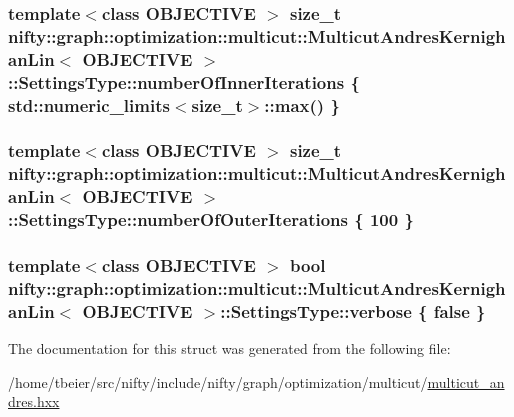 \subsubsection[{number\+Of\+Inner\+Iterations}]{\setlength{\rightskip}{0pt plus 5cm}template$<$class O\+B\+J\+E\+C\+T\+I\+V\+E $>$ size\+\_\+t {\bf nifty\+::graph\+::optimization\+::multicut\+::\+Multicut\+Andres\+Kernighan\+Lin}$<$ O\+B\+J\+E\+C\+T\+I\+V\+E $>$\+::Settings\+Type\+::number\+Of\+Inner\+Iterations \{ std\+::numeric\+\_\+limits$<$size\+\_\+t$>$\+::max() \}}\label{structnifty_1_1graph_1_1optimization_1_1multicut_1_1MulticutAndresKernighanLin_1_1SettingsType_a7f8372e73c3efb9307299428cc546128}
\hypertarget{structnifty_1_1graph_1_1optimization_1_1multicut_1_1MulticutAndresKernighanLin_1_1SettingsType_a04fd536ef01d3902d2f1c362ed34e6b2}{}
\subsubsection[{number\+Of\+Outer\+Iterations}]{\setlength{\rightskip}{0pt plus 5cm}template$<$class O\+B\+J\+E\+C\+T\+I\+V\+E $>$ size\+\_\+t {\bf nifty\+::graph\+::optimization\+::multicut\+::\+Multicut\+Andres\+Kernighan\+Lin}$<$ O\+B\+J\+E\+C\+T\+I\+V\+E $>$\+::Settings\+Type\+::number\+Of\+Outer\+Iterations \{ 100 \}}\label{structnifty_1_1graph_1_1optimization_1_1multicut_1_1MulticutAndresKernighanLin_1_1SettingsType_a04fd536ef01d3902d2f1c362ed34e6b2}
\hypertarget{structnifty_1_1graph_1_1optimization_1_1multicut_1_1MulticutAndresKernighanLin_1_1SettingsType_acec3bd5b7686a64cef0b24d403ad2b8a}{}
\subsubsection[{verbose}]{\setlength{\rightskip}{0pt plus 5cm}template$<$class O\+B\+J\+E\+C\+T\+I\+V\+E $>$ bool {\bf nifty\+::graph\+::optimization\+::multicut\+::\+Multicut\+Andres\+Kernighan\+Lin}$<$ O\+B\+J\+E\+C\+T\+I\+V\+E $>$\+::Settings\+Type\+::verbose \{ false \}}\label{structnifty_1_1graph_1_1optimization_1_1multicut_1_1MulticutAndresKernighanLin_1_1SettingsType_acec3bd5b7686a64cef0b24d403ad2b8a}


The documentation for this struct was generated from the following file\+:\begin{DoxyCompactItemize}
\item 
/home/tbeier/src/nifty/include/nifty/graph/optimization/multicut/\hyperlink{multicut__andres_8hxx}{multicut\+\_\+andres.\+hxx}\end{DoxyCompactItemize}
